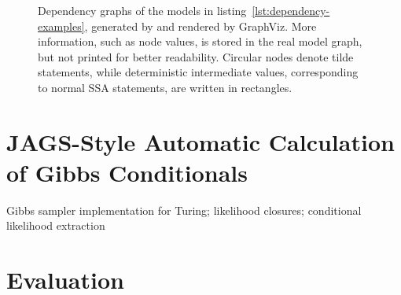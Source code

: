 \begin{figure}[p]
  \caption{Dependency graphs of the models in listing~\ref{lst:dependency-examples}, generated by
    \autogibbsjl{} and rendered by GraphViz.  More information, such as node values, is stored in
    the real model graph, but not printed for better readability.  Circular nodes denote tilde
    statements, while deterministic intermediate values, corresponding to normal SSA statements, are
    written in rectangles.}
  \label{fig:geom-deps}
\end{figure}




\section{JAGS-Style Automatic Calculation of Gibbs Conditionals}
\label{sec:jags-style-conditionals}

Gibbs sampler implementation for Turing; likelihood closures; conditional likelihood extraction


\section{Evaluation}
\label{sec:autogibbs-eval}

